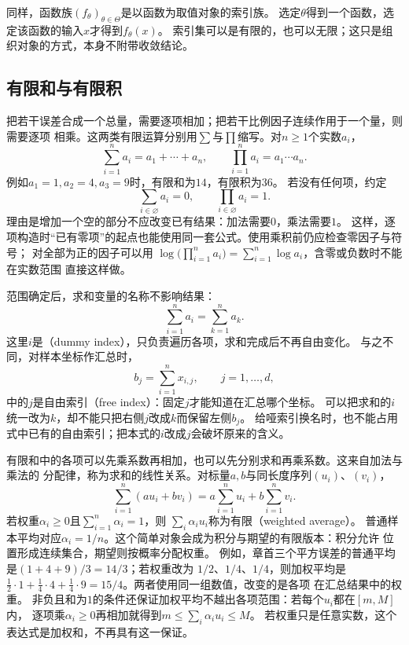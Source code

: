 同样，函数族$(f_\theta)_{\theta\in\Theta}$是以函数为取值对象的索引族。
选定$\theta$得到一个函数，选定该函数的输入$x$才得到$f_\theta(x)$。
索引集可以是有限的，也可以无限；这只是组织对象的方式，本身不附带收敛结论。

\subsection{有限和与有限积}
\label{sec:prelim-finite-sums-products}

把若干误差合成一个总量，需要逐项相加；把若干比例因子连续作用于一个量，则需要逐项
相乘。这两类有限运算分别用$\sum$与$\prod$缩写。对$n\geq1$个实数$a_i$，
\[
  \sum_{i=1}^{n}a_i=a_1+\cdots+a_n,\qquad
  \prod_{i=1}^{n}a_i=a_1\cdots a_n.
\]
例如$a_1=1,a_2=4,a_3=9$时，有限和为$14$，有限积为$36$。
若没有任何项，约定
\[
  \sum_{i\in\varnothing}a_i=0,\qquad
  \prod_{i\in\varnothing}a_i=1.
\]
理由是增加一个空的部分不应改变已有结果：加法需要$0$，乘法需要$1$。
这样，逐项构造时“已有零项”的起点也能使用同一套公式。使用乘积前仍应检查零因子与符号；
对全部为正的因子可以用
$\log\bigl(\prod_{i=1}^{n}a_i\bigr)=\sum_{i=1}^{n}\log a_i$，含零或负数时不能在实数范围
直接这样做。

范围确定后，求和变量的名称不影响结果：
\[
  \sum_{i=1}^{n}a_i=\sum_{k=1}^{n}a_k.
\]
这里$i$是（dummy index），只负责遍历各项，求和完成后不再自由变化。
与之不同，对样本坐标作汇总时，
\[
  b_j=\sum_{i=1}^{n}x_{i,j},\qquad j=1,\ldots,d,
\]
中的$j$是自由索引（free index）：固定$j$才能知道在汇总哪个坐标。
可以把求和的$i$统一改为$k$，却不能只把右侧$j$改成$k$而保留左侧$b_j$。
给哑索引换名时，也不能占用式中已有的自由索引；把本式的$i$改成$j$会破坏原来的含义。

有限和中的各项可以先乘系数再相加，也可以先分别求和再乘系数。这来自加法与乘法的
分配律，称为求和的线性关系。对标量$a,b$与同长度序列$(u_i)$、$(v_i)$，
\[
  \sum_{i=1}^{n}(au_i+bv_i)
  =
  a\sum_{i=1}^{n}u_i+b\sum_{i=1}^{n}v_i.
\]
若权重$\alpha_i\geq0$且$\sum_{i=1}^{n}\alpha_i=1$，则
$\sum_i\alpha_i u_i$称为有限（weighted average）。
普通样本平均对应$\alpha_i=1/n$。这个简单对象会成为积分与期望的有限版本：积分允许
位置形成连续集合，期望则按概率分配权重。
例如，章首三个平方误差的普通平均是$(1+4+9)/3=14/3$；若权重改为
$1/2$、$1/4$、$1/4$，则加权平均是
$\frac12\cdot1+\frac14\cdot4+\frac14\cdot9=15/4$。两者使用同一组数值，改变的是各项
在汇总结果中的权重。
非负且和为$1$的条件还保证加权平均不越出各项范围：若每个$u_i$都在$[m,M]$内，
逐项乘$\alpha_i\geq0$再相加就得到$m\leq\sum_i\alpha_i u_i\leq M$。
若权重只是任意实数，这个表达式是加权和，不再具有这一保证。

